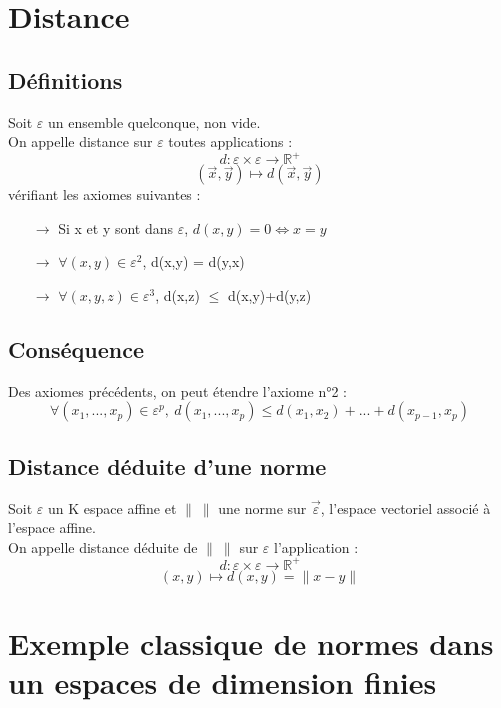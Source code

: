 \section{Distance}
\subsection{Définitions}
\begin{de}
Soit $\varepsilon$ un ensemble quelconque, non vide.\\
On appelle distance sur $\varepsilon$ toutes applications :
$$d : \varepsilon \times \varepsilon \rightarrow \mathbb{R}^+$$
$$(\overrightarrow{x},\overrightarrow{y}) \mapsto d(\overrightarrow{x},\overrightarrow{y})$$
vérifiant les axiomes suivantes :\\ 
\begin{itemize}
 \item[$\rightarrow$] Si x et y sont dans $\varepsilon$, $d(x,y)=0 \Leftrightarrow x=y$\\
 \item[$\rightarrow$] $\forall(x,y) \in \varepsilon^2$, d(x,y) = d(y,x)\\
 \item[$\rightarrow$] $\forall(x,y,z) \in \varepsilon^3$, d(x,z) $\leq$ d(x,y)+d(y,z)\\
\end{itemize}
\end{de}
\subsection{Conséquence}
Des axiomes précédents, on peut étendre l'axiome n°2 : 
$$\forall(x_1,...,x_p) \in \varepsilon^p,~ d(x_1,...,x_p) \leq d(x_1,x_2) + ... + d(x_{p-1},x_p)$$
\subsection{Distance déduite d'une norme}
\begin{de}
Soit $\varepsilon$ un K espace affine et $\parallel~\parallel$ une norme sur $\overrightarrow{\varepsilon}$, l'espace vectoriel associé à l'espace affine.\\
On appelle distance déduite de $\parallel~\parallel$  sur $\varepsilon$ l'application : 
$$d : \varepsilon \times \varepsilon \rightarrow \mathbb{R}^+$$
$$(x,y) \mapsto d(x,y) = \parallel x - y\parallel$$
\end{de}
\section{Exemple classique de normes dans un espaces de dimension finies}
